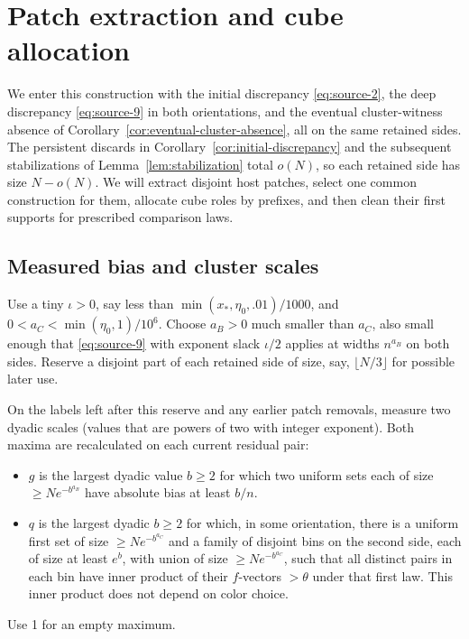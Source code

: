 \section{Patch extraction and cube allocation}
\label{sec:patch-tiling-under-9}

We enter this construction with the initial discrepancy
\eqref{eq:source-2}, the deep discrepancy \eqref{eq:source-9} in both
orientations, and the eventual cluster-witness absence of
Corollary~\ref{cor:eventual-cluster-absence}, all on the same retained
sides. The persistent discards in Corollary~\ref{cor:initial-discrepancy}
and the subsequent stabilizations of Lemma~\ref{lem:stabilization} total
\(o(N)\), so each retained side has size \(N-o(N)\). We will extract
disjoint host patches, select one common construction for them, allocate
cube roles by prefixes, and then clean their first supports for prescribed
comparison laws.

\subsection{Measured bias and cluster scales}
\label{sec:measured-patch-scales}

Use a tiny \(\iota>0\), say less than \(\min(x_*,\eta_0,.01)/1000\), and \(0<a_C<\min(\eta_0,1)/10^6\). Choose \(a_B>0\) much smaller than \(a_C\), also small enough that \eqref{eq:source-9} with exponent slack \(\iota/2\) applies at widths \(n^{a_B}\) on both sides. Reserve a disjoint part of each retained side of size, say, \(\lfloor N/3\rfloor\) for possible later use.

\begin{definition}\label{def:residual-scales}
On the labels left after this reserve and any earlier patch removals, measure two dyadic scales (values that are powers of two with integer exponent). Both maxima are recalculated on each current residual pair:
\begin{itemize}
\item \(g\) is the largest dyadic value \(b\ge2\) for which two uniform sets each of size \(\ge N e^{-b^{a_B}}\) have absolute bias at least \(b/n\).
\item \(q\) is the largest dyadic \(b\ge2\) for which, in some orientation, there is a uniform first set of size \(\ge N e^{-b^{a_C}}\) and a family of disjoint bins on the second side, each of size at least \(e^b\), with union of size \(\ge N e^{-b^{a_C}}\), such that all distinct pairs in each bin have inner product of their \(f\)-vectors \(>\theta\) under that first law. This inner product does not depend on color choice.
\end{itemize}

Use 1 for an empty maximum.
\end{definition}


